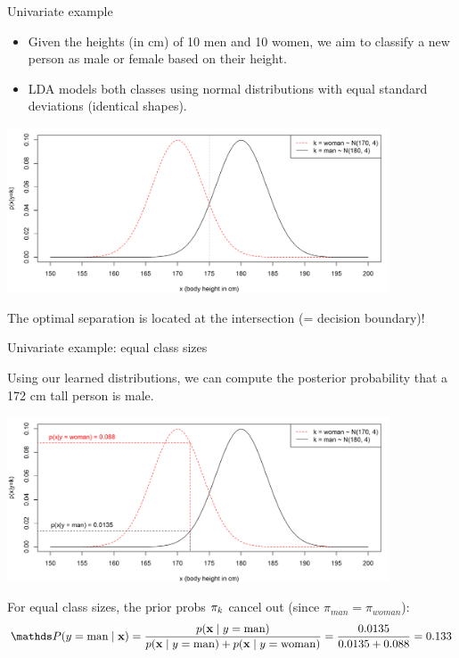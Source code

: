 \documentclass[11pt,compress,t,notes=noshow, xcolor=table]{beamer}
\begin{document}
\begin{vbframe}{Univariate example}
\begin{small}
\begin{itemize}
\item Given the heights (in cm) of 10 men and 10 women, we aim to classify a new person as male or female based on their height.
\item LDA models both classes using normal distributions with equal standard deviations (identical shapes).
\end{itemize}
\begin{center}
\includegraphics[width=0.85\textwidth, clip=true, trim={0 0 0 0}]{figure/disc_univariate-1.png}
\end{center}
\centerline{The optimal separation is located at the intersection (= decision boundary)!}
\end{small}
\end{vbframe}

\begin{vbframe}{Univariate example: equal class sizes}
\begin{small}
Using our learned distributions, we can compute the posterior probability that a 172 cm tall person is male.
\begin{center}
\includegraphics[width=0.85\textwidth, clip=true, trim={0 0 0 0}]{figure/disc_univariate-2.png}
\end{center}
For equal class sizes, the prior probs $\pi_{k}$ cancel out (since $\pi_{man} = \pi_{woman}$):
$$
\P(y = \text{man} \mid \xv) = \frac{p(\xv \mid y = \text{man})}{p(\xv \mid y = \text{man}) + p(\xv \mid y = \text{woman})} = \frac{0.0135}{0.0135 + 0.088} = 0.133
$$
\end{small}
\end{vbframe}
\end{document}
